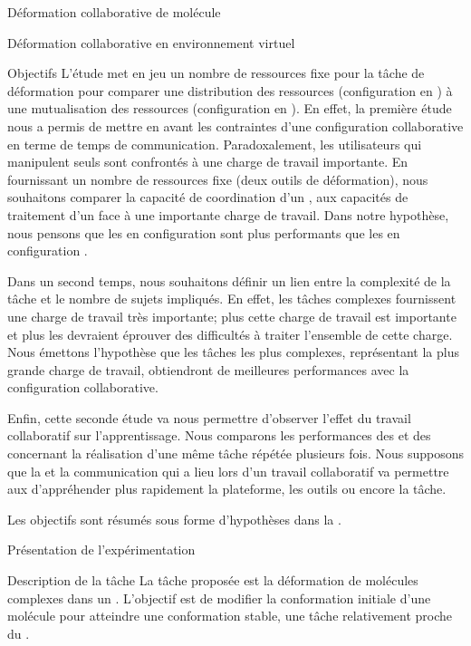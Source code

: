 \documentclass[myfrancais,ngerman,english,french]{mythesis}
\begin{document}
\begin{mychapter}{Déformation collaborative de molécule}
\begin{mysection}{Déformation collaborative en environnement virtuel}
\begin{mysubsection}{Objectifs}
				L'étude met en jeu un nombre de ressources fixe pour la tâche de déformation pour comparer une distribution des ressources (configuration  en ) à une mutualisation des ressources (configuration  en ).
				En effet, la première étude nous a permis de mettre en avant les contraintes d'une configuration collaborative en terme de temps de communication.
				Paradoxalement, les utilisateurs qui manipulent seuls sont confrontés à une charge de travail importante.
				En fournissant un nombre de ressources fixe (deux outils de déformation), nous souhaitons comparer la capacité de coordination d'un , aux capacités de traitement d'un  face à une importante charge de travail.
				Dans notre hypothèse, nous pensons que les  en configuration  sont plus performants que les  en configuration .

				Dans un second temps, nous souhaitons définir un lien entre la complexité de la tâche et le nombre de sujets impliqués.
				En effet, les tâches complexes fournissent une charge de travail très importante; plus cette charge de travail est importante et plus les  devraient éprouver des difficultés à traiter l'ensemble de cette charge.
				Nous émettons l'hypothèse que les tâches les plus complexes, représentant la plus grande charge de travail, obtiendront de meilleures performances avec la configuration collaborative.

				Enfin, cette seconde étude va nous permettre d'observer l'effet du travail collaboratif sur l'apprentissage.
				Nous comparons les performances des  et des  concernant la réalisation d'une même tâche répétée plusieurs fois.
				Nous supposons que la   et la communication qui a lieu lors d'un travail collaboratif va permettre aux  d'appréhender plus rapidement la plateforme, les outils ou encore la tâche.

				Les objectifs sont résumés sous forme d'hypothèses dans la .
			\end{mysubsection}
		\end{mysection}
		\begin{mysection}{Présentation de l'expérimentation}
			\begin{mysubsection}{Description de la tâche}
				La tâche proposée est la déformation de molécules complexes dans un .
				L'objectif est de modifier la conformation initiale d'une molécule pour atteindre une conformation stable, une tâche relativement proche du .


\end{mysubsection}
\end{mysection}
\end{mychapter}
\end{document}
